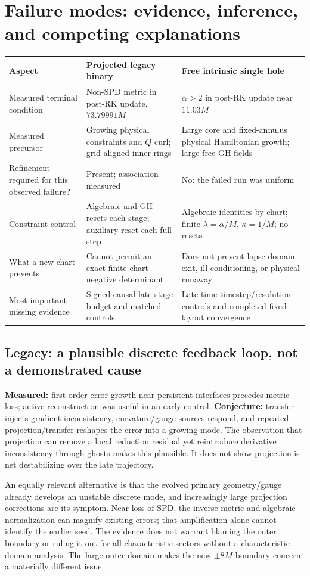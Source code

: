 \documentclass[11pt,letterpaper]{article}
\begin{document}
\section{Failure modes: evidence, inference, and competing explanations}
\begin{longtable}{P{.21\linewidth}P{.35\linewidth}P{.36\linewidth}}
\toprule Aspect & Projected legacy binary & Free intrinsic single hole\\\midrule
Measured terminal condition & Non-SPD metric in post-RK update, $73.79991M$ & $\alpha>2$ in post-RK update near $11.03M$\\
Measured precursor & Growing physical constraints and $Q$ curl; grid-aligned inner rings & Large core and fixed-annulus physical Hamiltonian growth; large free GH fields\\
Refinement required for this observed failure? & Present; association measured & No: the failed run was uniform\\
Constraint control & Algebraic and GH resets each stage; auxiliary reset each full step & Algebraic identities by chart; finite $\lambda=\alpha/M$, $\kappa=1/M$; no resets\\
What a new chart prevents & Cannot permit an exact finite-chart negative determinant & Does not prevent lapse-domain exit, ill-conditioning, or physical runaway\\
Most important missing evidence & Signed causal late-stage budget and matched controls & Late-time timestep/resolution controls and completed fixed-layout convergence\\\bottomrule
\end{longtable}

\subsection{Legacy: a plausible discrete feedback loop, not a demonstrated cause}
\textbf{Measured:} first-order error growth near persistent interfaces precedes metric loss; active reconstruction was useful in an early control. \textbf{Conjecture:} transfer injects gradient inconsistency, curvature/gauge sources respond, and repeated projection/transfer reshapes the error into a growing mode. The observation that projection can remove a local reduction residual yet reintroduce derivative inconsistency through ghosts makes this plausible. It does not show projection is net destabilizing over the late trajectory.

An equally relevant alternative is that the evolved primary geometry/gauge already develops an unstable discrete mode, and increasingly large projection corrections are its symptom. Near loss of SPD, the inverse metric and algebraic normalization can magnify existing errors; that amplification alone cannot identify the earlier seed. The evidence does not warrant blaming the outer boundary or ruling it out for all characteristic sectors without a characteristic-domain analysis. The large outer domain makes the new $\pm8M$ boundary concern a materially different issue.
\end{document}
